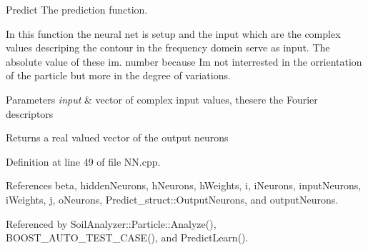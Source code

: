 Predict The prediction function. 

In this function the neural net is setup and the input which are the complex values descriping the contour in the frequency domein serve as input. The absolute value of these im. number because I\textquotesingle{}m not interrested in the orrientation of the particle but more in the degree of variations. 
\begin{DoxyParams}{Parameters}
{\em input} & vector of complex input values, these\textquotesingle{}re the Fourier descriptors \\
\hline
\end{DoxyParams}
\begin{DoxyReturn}{Returns}
a real valued vector of the output neurons 
\end{DoxyReturn}


Definition at line 49 of file N\+N.\+cpp.



References beta, hidden\+Neurons, h\+Neurons, h\+Weights, i, i\+Neurons, input\+Neurons, i\+Weights, j, o\+Neurons, Predict\+\_\+struct\+::\+Output\+Neurons, and output\+Neurons.



Referenced by Soil\+Analyzer\+::\+Particle\+::\+Analyze(), B\+O\+O\+S\+T\+\_\+\+A\+U\+T\+O\+\_\+\+T\+E\+S\+T\+\_\+\+C\+A\+S\+E(), and Predict\+Learn().


